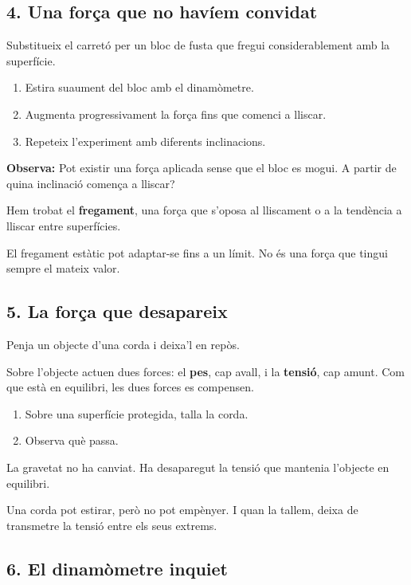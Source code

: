 \subsection{4. Una força que no havíem convidat}

Substitueix el carretó per un bloc de fusta que fregui considerablement amb la superfície.
\begin{enumerate}
    \item Estira suaument del bloc amb el dinamòmetre.
    \item Augmenta progressivament la força fins que comenci a lliscar.
    \item Repeteix l'experiment amb diferents inclinacions.
\end{enumerate}

\textbf{Observa:} Pot existir una força aplicada sense que el bloc es mogui. A partir de quina inclinació comença a lliscar?

Hem trobat el \textbf{fregament}, una força que s'oposa al lliscament o a la tendència a lliscar entre superfícies.

El fregament estàtic pot adaptar-se fins a un límit. No és una força que tingui sempre el mateix valor.

\subsection{5. La força que desapareix}

Penja un objecte d'una corda i deixa'l en repòs.

Sobre l'objecte actuen dues forces: el \textbf{pes}, cap avall, i la \textbf{tensió}, cap amunt. Com que està en equilibri, les dues forces es compensen.

\begin{enumerate}
    \item Sobre una superfície protegida, talla la corda.
    \item Observa què passa.
\end{enumerate}

La gravetat no ha canviat. Ha desaparegut la tensió que mantenia l'objecte en equilibri.

Una corda pot estirar, però no pot empènyer. I quan la tallem, deixa de transmetre la tensió entre els seus extrems. 

\subsection{6. El dinamòmetre inquiet}

